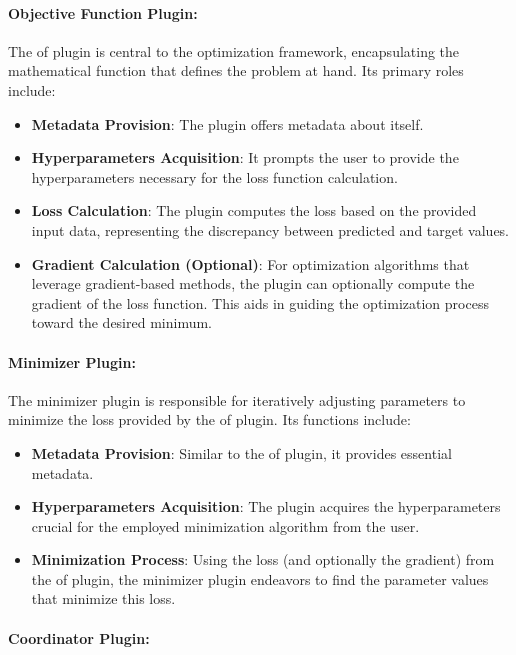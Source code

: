 \documentclass[
  a4paper,  %
  twoside,  %
  bibliography=totoc,
  headsepline,
  cleardoublepage=empty,
  parskip=half,
  draft=false
]{scrbook}
\begin{document}
\paragraph{Objective Function Plugin:}

The \gls{of} plugin is central to the optimization framework, encapsulating the mathematical function that defines the problem at hand.
Its primary roles include:

\begin{itemize}
\item \textbf{Metadata Provision}: The plugin offers metadata about itself.
\item \textbf{Hyperparameters Acquisition}: It prompts the user to provide the hyperparameters necessary for the loss function calculation.
\item \textbf{Loss Calculation}: The plugin computes the loss based on the provided input data, representing the discrepancy between predicted and target values.
\item \textbf{Gradient Calculation (Optional)}: For optimization algorithms that leverage gradient-based methods, the plugin can optionally compute the gradient of the loss function.
This aids in guiding the optimization process toward the desired minimum.
\end{itemize}

\paragraph{Minimizer Plugin:}

The minimizer plugin is responsible for iteratively adjusting parameters to minimize the loss provided by the \gls{of} plugin.
Its functions include:

\begin{itemize}
\item \textbf{Metadata Provision}: Similar to the \gls{of} plugin, it provides essential metadata.
\item \textbf{Hyperparameters Acquisition}: The plugin acquires the hyperparameters crucial for the employed minimization algorithm from the user.
\item \textbf{Minimization Process}: Using the loss (and optionally the gradient) from the \gls{of} plugin, the minimizer plugin endeavors to find the parameter values that minimize this loss.
\end{itemize}

\paragraph{Coordinator Plugin:}
\end{document}
